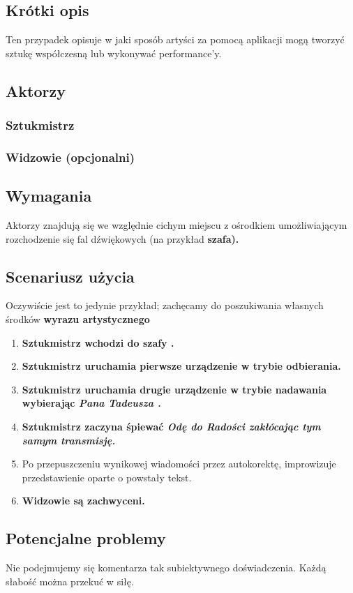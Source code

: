 \documentclass{article}
\begin{document}
\subsection{Krótki opis}
Ten przypadek opisuje w jaki sposób artyści za pomocą aplikacji mogą tworzyć sztukę współczesną lub wykonywać performance'y.
\subsection{Aktorzy}
\subsubsection{Sztukmistrz}
\subsubsection{Widzowie (opcjonalni)}
\subsection{Wymagania}
Aktorzy znajdują się we względnie cichym miejscu z ośrodkiem umożliwiającym rozchodzenie się fal dźwiękowych (na przykład \bf{szafa}).

\subsection{Scenariusz użycia}
\normalfont
Oczywiście jest to jedynie przykład; zachęcamy do poszukiwania własnych środków \bf wyrazu artystycznego
\begin{enumerate}
	\normalfont \item \bf Sztukmistrz \normalfont wchodzi do \bf szafy \normalfont.
	\item \bf Sztukmistrz \normalfont uruchamia pierwsze urządzenie w trybie odbierania.
	\item \bf Sztukmistrz \normalfont uruchamia drugie urządzenie w trybie nadawania wybierając \it Pana Tadeusza \normalfont.
	\item \bf Sztukmistrz \normalfont zaczyna śpiewać \it Odę do Radości \normalfont zakłócając tym samym transmisję.
	\item Po przepuszczeniu wynikowej wiadomości przez autokorektę, improwizuje przedstawienie oparte o powstały tekst.
	\item \bf Widzowie \normalfont są \bf zachwyceni\normalfont.
\end{enumerate}

\subsection{Potencjalne problemy}
\normalfont
Nie podejmujemy się komentarza tak subiektywnego doświadczenia. Każdą słabość można przekuć w siłę.
\end{document}
